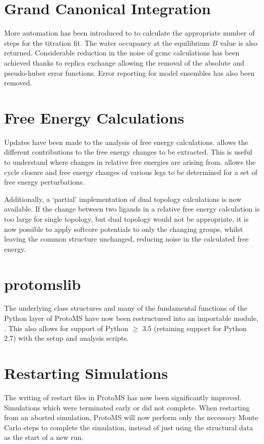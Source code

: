 \documentclass[letterpaper,10pt,english]{sphinxmanual}
\begin{document}
\section{Grand Canonical Integration}
\label{\detokenize{changelog:grand-canonical-integration}}
More automation has been introduced to  to calculate the appropriate number of steps for the titration fit. The water occupancy at the equilibrium \(B\) value is also returned. Considerable reduction in the noise of gcmc calculations has been achieved thanks to replica exchange allowing the removal of the absolute and pseudo-huber error functions. Error reporting for model ensembles has also been removed.


\section{Free Energy Calculations}
\label{\detokenize{changelog:free-energy-calculations}}
Updates have been made to the analysis of free energy calculations.  allows the different contributions to the free energy changes to be extracted. This is useful to understand where changes in relative free energies are arising from.  allows the cycle closure and free energy changes of various legs to be determined for a set of free energy perturbations.

Additionally, a ‘partial’ implementation of dual topology calculations is now available. If the change between two ligands in a relative free energy calculation is too large for single topology, but dual topology would not be appropriate, it is now possible to apply softcore potentials to only the changing groups, whilst leaving the common structure unchanged, reducing noise in the calculated free energy.


\section{protomslib}
\label{\detokenize{changelog:protomslib}}
The underlying class structures and many of the fundamental functions of the Python layer of ProtoMS have now been restructured into an importable module, . This also allows for support of Python \(\geq\) 3.5 (retaining support for Python 2.7) with the setup and analysis scripts.


\section{Restarting Simulations}
\label{\detokenize{changelog:restarting-simulations}}
The writing of restart files in ProtoMS has now been significantly improved. Simulations which were terminated early or did not complete. When restarting from an aborted simulation, ProtoMS will now perform only the necessary Monte Carlo steps to complete the simulation, instead of just using the structural data as the start of a new run.
\end{document}
